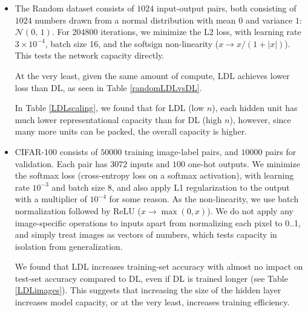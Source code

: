 \documentclass{article}
\begin{document}
\begin{itemize}
\item The Random dataset consists of $1024$ input-output pairs, both consisting of $1024$ numbers drawn from a normal distribution with mean $0$ and variance $1$: $\mathcal{N}(0,\,1)$. For 204800 iterations, we minimize the L2 loss, with learning rate $3 \times 10^{-4}$, batch size 16, and the softsign non-linearity ($x \rightarrow x/(1+|x|)$). This tests the network capacity directly.

At the very least, given the same amount of compute, LDL achieves lower loss than DL, as seen in Table \ref{randomLDLvsDL}.

In Table \ref{LDLscaling}, we found that for LDL (low $n$), each hidden unit has much lower representational capacity than for DL (high $n$), however, since many more units can be packed, the overall capacity is higher.

\item CIFAR-100 consists of $50000$ training image-label pairs, and $10000$ pairs for validation. Each pair has $3072$ inputs and $100$ one-hot outputs. We minimize the softmax loss (cross-entropy loss on a softmax activation), with learning rate $10^{-3}$ and batch size 8, and also apply L1 regularization to the output with a multiplier of $10^{-4}$ for some reason. As the non-linearity, we use batch normalization \cite{ioffe2015batch} followed by ReLU ($x \rightarrow \max(0,x)$). We do not apply any image-specific operations to inputs apart from normalizing each pixel to 0..1, and simply treat images as vectors of numbers, which tests capacity in isolation from generalization.

We found that LDL increases training-set accuracy with almost no impact on test-set accuracy compared to DL, even if DL is trained longer (see Table \ref{LDLimages}). This suggests that increasing the size of the hidden layer increases model capacity, or at the very least, increases training efficiency.
\end{itemize}
\end{document}
